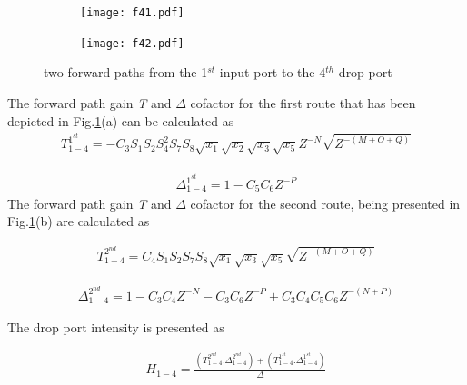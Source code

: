 \documentclass{osa-article}
\begin{document}
\begin{figure}[h!]
  \centering
    \begin{subfigure}[b]{0.4\linewidth}
    \texttt{[image: f41.pdf]}
    \caption{}
  \end{subfigure}
  \begin{subfigure}[b]{0.4\linewidth}
    \texttt{[image: f42.pdf]}
    \caption{}
  \end{subfigure}
  \caption{two forward paths from the 1$^{st}$ input port to the 4$^{th}$ drop port}
  \label{figa3}
\end{figure}

The forward path gain \textit {T} and $\Delta$ cofactor for the first route that has been depicted in Fig.\ref{figa3}(a) can be calculated as\\

\begin{equation}
\begin{split}
T^{1^{st}}_{1-4}=-C_3S_1S_2{S^2_{4}}S_7S_8\sqrt{x_1}\sqrt{x_2}\sqrt{x_3}\sqrt{x_5}Z^{-N}\sqrt{Z^{-(M+O+Q)}}
 \label{eqa51}
\end{split}
\end{equation}

\begin{equation}
\begin{split}
\Delta^{1^{st}}_{1-4}=1-C_5C_6Z^{-P}
 \label{eqa52}
\end{split}
\end{equation}
The forward path gain \textit {T} and $\Delta$ cofactor for the second route, being presented in Fig.\ref{figa3}(b) are calculated as

\begin{equation}
\begin{split}
T^{2^{nd}}_{1-4}=C_4S_1S_2S_7S_8\sqrt{x_1}\sqrt{x_3}\sqrt{x_5}\sqrt{Z^{-(M+O+Q)}}
\end{split}
\end{equation}

\begin{equation}
\begin{split}
\Delta^{2^{nd}}_{1-4}=1-C_3C_4Z^{-N}-C_3C_6Z^{-P}+C_3C_4C_5C_6Z^{-(N+P)}
\end{split}
\end{equation}

The drop port intensity is presented as

\begin{equation}
\begin{split}
H_{1-4}=\frac{(T^{2^{nd}}_{1-4}.\Delta^{2^{nd}}_{1-4})+(T^{1^{st}}_{1-4}.\Delta^{1^{st}}_{1-4})}{\Delta}
\end{split}
\end{equation}
\end{document}
